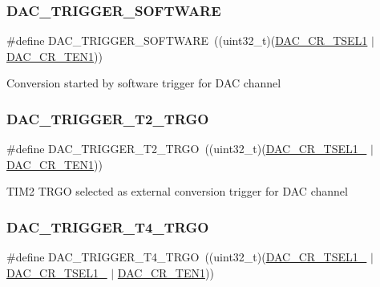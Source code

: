 \subsubsection{\texorpdfstring{DAC\_TRIGGER\_SOFTWARE}{DAC\_TRIGGER\_SOFTWARE}}
{\footnotesize\ttfamily \#define D\+A\+C\+\_\+\+T\+R\+I\+G\+G\+E\+R\+\_\+\+S\+O\+F\+T\+W\+A\+RE~((uint32\+\_\+t)(\mbox{\hyperlink{group___peripheral___registers___bits___definition_gaf951c1a57a1a19e356df57d908f09c6c}{D\+A\+C\+\_\+\+C\+R\+\_\+\+T\+S\+E\+L1}} $\vert$ \mbox{\hyperlink{group___peripheral___registers___bits___definition_ga998aa4fd791ea2f4626df6ddc8fc7109}{D\+A\+C\+\_\+\+C\+R\+\_\+\+T\+E\+N1}}))}

Conversion started by software trigger for D\+AC channel \mbox{\label{group___d_a_c__trigger__selection_ga22ceec14e367d69b762460b18ee92c2f}} 
\subsubsection{\texorpdfstring{DAC\_TRIGGER\_T2\_TRGO}{DAC\_TRIGGER\_T2\_TRGO}}
{\footnotesize\ttfamily \#define D\+A\+C\+\_\+\+T\+R\+I\+G\+G\+E\+R\+\_\+\+T2\+\_\+\+T\+R\+GO~((uint32\+\_\+t)(\mbox{\hyperlink{group___peripheral___registers___bits___definition_gaa625d7638422e90a616ac93edd4bf408}{D\+A\+C\+\_\+\+C\+R\+\_\+\+T\+S\+E\+L1\+\_}} $\vert$ \mbox{\hyperlink{group___peripheral___registers___bits___definition_ga998aa4fd791ea2f4626df6ddc8fc7109}{D\+A\+C\+\_\+\+C\+R\+\_\+\+T\+E\+N1}}))}

T\+I\+M2 T\+R\+GO selected as external conversion trigger for D\+AC channel \mbox{\label{group___d_a_c__trigger__selection_ga8b8af83b9df4fd42495c6813a09ef7ae}} 
\subsubsection{\texorpdfstring{DAC\_TRIGGER\_T4\_TRGO}{DAC\_TRIGGER\_T4\_TRGO}}
{\footnotesize\ttfamily \#define D\+A\+C\+\_\+\+T\+R\+I\+G\+G\+E\+R\+\_\+\+T4\+\_\+\+T\+R\+GO~((uint32\+\_\+t)(\mbox{\hyperlink{group___peripheral___registers___bits___definition_gaa625d7638422e90a616ac93edd4bf408}{D\+A\+C\+\_\+\+C\+R\+\_\+\+T\+S\+E\+L1\+\_}} $\vert$ \mbox{\hyperlink{group___peripheral___registers___bits___definition_ga8dfa13ec123c583136e24b7890add45b}{D\+A\+C\+\_\+\+C\+R\+\_\+\+T\+S\+E\+L1\+\_}} $\vert$ \mbox{\hyperlink{group___peripheral___registers___bits___definition_ga998aa4fd791ea2f4626df6ddc8fc7109}{D\+A\+C\+\_\+\+C\+R\+\_\+\+T\+E\+N1}}))}

